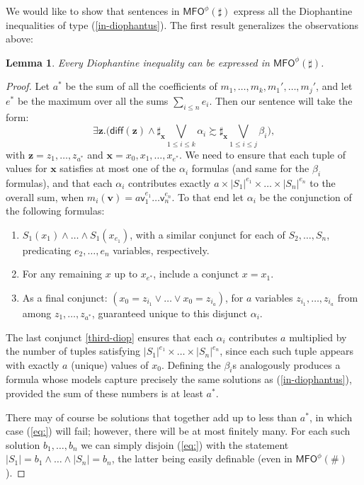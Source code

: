\documentclass[12pt,oneside,reqno]{amsart}
\newtheorem{lemma}{Lemma}
\theoremstyle{definition}
\begin{document}
We would like to show that sentences in $\mathsf{MFO}^{\phi}(\sharp)$ express all the Diophantine inequalities of type (\ref{in-diophantus}). The first result generalizes the observations above:
\begin{lemma} Every Diophantine inequality can be expressed in $\mathsf{MFO}^{\phi}(\sharp)$. \label{lemma:diophantus}
\end{lemma}
\begin{proof} Let $a^*$ be the sum of all the coefficients of $m_1,\dots,m_k,m_1',\dots,m_j'$, and let $e^*$ be the maximum over all the sums $\sum_{i \leq n} e_i$. Then our sentence will take the form: \begin{equation} \exists \mathbf{z}.\Big(\mathsf{diff}(\mathbf{z}) \wedge \sharp_{\mathbf{x}} \bigvee_{1\leq i \leq k} \alpha_i \succsim \sharp_{\mathbf{x}} \bigvee_{1 \leq i \leq j} \beta_i\Big), \label{eq:} \end{equation}\vspace{0.5ex} with $\mathbf{z} = z_1,\dots,z_{a^*}$ and $\mathbf{x} = x_0,x_1,\dots,x_{e^*}$. We need to ensure that each tuple of values for $\mathbf{x}$ satisfies at most one of the $\alpha_i$ formulas (and same for the $\beta_i$ formulas), and that each $\alpha_i$ contributes exactly $a \times |S_1|^{e_1}\times \dots \times |S_n|^{e_n}$ to the overall sum, when $m_i(\mathbf{v}) = a \mathsf{v}_1^{e_1}\dots \mathsf{v}_n^{e_n}$. To that end let $\alpha_i$ be the conjunction of the following formulas:\vspace{0.5ex} \begin{enumerate}[label=(\roman*)]
    \item $S_1(x_1) \wedge \dots \wedge S_1(x_{e_1})$, with a similar conjunct for each of $S_2,\dots,S_n$, predicating $e_2,\dots,e_n$ variables, respectively.\vspace{0.5mm}
    \item For any remaining $x$ up to $x_{e^*}$, include a conjunct $x= x_1$.\vspace{0.5mm}
    \item As a final conjunct: $(x_0 = z_{i_1} \vee \dots \vee x_0 = z_{i_a})$, for $a$ variables $z_{i_1},\dots,z_{i_a}$ from among $z_1,\dots,z_{a^*}$, guaranteed unique to this disjunct $\alpha_i$. \label{third-diop}
\end{enumerate}\vspace{0.5ex}

The last conjunct \ref{third-diop} ensures that each $\alpha_i$ contributes $a$ multiplied by the number of tuples satisfying $|S_1|^{e_1}\times \dots \times |S_n|^{e_n}$, since each such tuple appears with exactly $a$ (unique) values of $x_0$. Defining the $\beta_i$s analogously produces a formula whose models capture precisely the same solutions as (\ref{in-diophantus}), provided the sum of these numbers is at least $a^*$. 

There may of course be solutions that together add up to less than $a^*$, in which case (\ref{eq:}) will fail; however, there will be at most finitely many. For each such solution $b_1,\dots,b_n$ we can simply disjoin (\ref{eq:}) with the statement $|S_1|=b_1 \wedge \dots \wedge |S_n|=b_n$, the latter being easily definable (even in $\mathsf{MFO}^\phi(\#)$). 
\end{proof}
\end{document}

